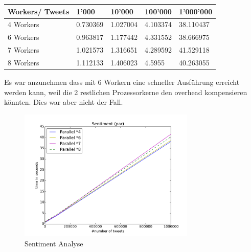 \documentclass[12pt, oneside]{report}   	%
\begin{document}
\begin{table}[h]
    \begin{tabular}{|l|l|l|l|l|}
    \hline
    Workers/ Tweets         & 1'000    & 10'000   & 100'000  & 1'000'000 \\ \hline
    4 Workers & 0.730369 & 1.027004 & 4.103374 & 38.110437 \\ \hline
    6 Workers & 0.963817 & 1.177442 & 4.331552 & 38.666975 \\ \hline
    7 Workers & 1.021573 & 1.316651 & 4.289592 & 41.529118 \\ \hline
    8 Workers & 1.112133 & 1.406023 & 4.5955   & 40.263055 \\ \hline
    \end{tabular}
\end{table}

Es war anzunehmen dass mit 6 Workern eine schneller Ausführung erreicht werden kann, weil die 2 restlichen Prozessorkerne den overhead kompensieren könnten. Dies war aber nicht der Fall.

\begin{figure}[h]
\begin{center}
\includegraphics[width=0.75\textwidth]{bilder/time_senitment_par.pdf}
\caption{Sentiment Analyse}
\label{img:performancesentiment}
\end{center}
\end{figure}

\end{document}
